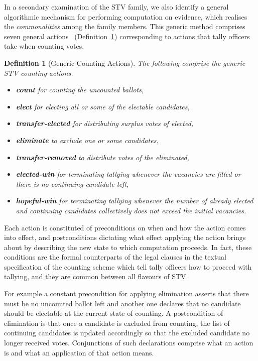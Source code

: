 \documentclass[10pt,conference]{IEEEtran}
\newtheorem{definition}{Definition}
\begin{document}
In a secondary examination of the STV family, we also identify a general algorithmic mechanism for performing computation on evidence, which realises the \emph{commonalities} among the family members. This generic method comprises seven general actions%
~(Definition~\ref{transitions}) corresponding to actions that tally officers take when counting votes.
\begin{definition}[Generic Counting Actions]\label{transitions}
 The following comprise the generic STV counting actions.
 \begin{itemize}
\item\textbf{count} for counting the uncounted ballots,
\item\textbf{elect} for electing all or some of the electable candidates, 
\item\textbf{transfer-elected} for distributing surplus votes of elected, %
\item\textbf{eliminate} to exclude one or some candidates, 
\item\textbf{transfer-removed} to distribute votes of   the eliminated, %
\item\textbf{elected-win} for terminating tallying whenever the vacancies are filled or there is no continuing candidate left, 
\item\textbf{hopeful-win} for terminating tallying whenever  the number of already elected and continuing candidates collectively does not exceed the initial vacancies. 
\end{itemize}
\end{definition}
Each action is constituted of  preconditions on when and how the action comes into effect, and postconditions dictating what effect applying the action brings about by describing the new state to which computation proceeds. In fact, these conditions are the formal counterparts of the legal clauses in the textual specification of the counting scheme which tell tally officers how to proceed with tallying, and they are common between all flavours of STV. 

For example a constant precondition for applying elimination  asserts that there must be no uncounted ballot left and another one declares that no candidate should be electable at the current state of counting. A postcondition of elimination is that once a candidate is excluded from counting, the list of continuing candidates is updated accordingly so that the excluded candidate no longer received votes. Conjunctions of such declarations comprise what an action is and what an application of that action means.
\end{document}
